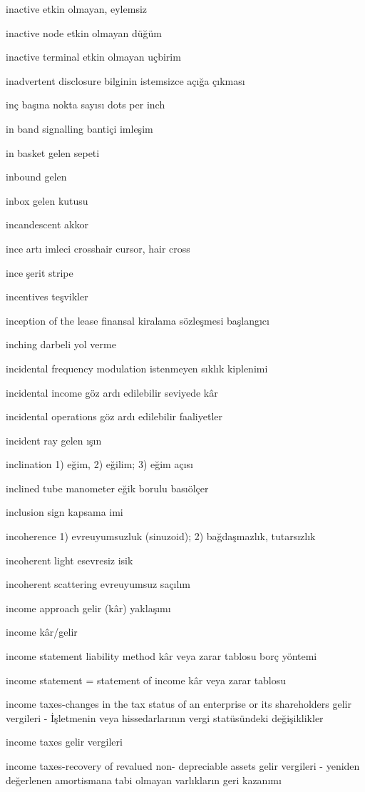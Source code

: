 \documentclass[12pt,fleqn]{article}\usepackage{../../common}
\begin{document}
inactive etkin olmayan, eylemsiz

inactive node etkin olmayan düğüm

inactive terminal etkin olmayan uçbirim

inadvertent disclosure bilginin istemsizce açığa çıkması

inç başına nokta sayısı dots per inch

in band signalling bantiçi imleşim

in basket gelen sepeti

inbound gelen

inbox gelen kutusu

incandescent akkor

ince artı imleci crosshair cursor, hair cross

ince şerit stripe

incentives teşvikler

inception of the lease finansal kiralama sözleşmesi başlangıcı

inching darbeli yol verme

incidental frequency modulation istenmeyen sıklık kiplenimi

incidental income göz ardı edilebilir seviyede kâr

incidental operations göz ardı edilebilir faaliyetler

incident ray gelen ışın

inclination 1) eğim, 2) eğilim; 3) eğim açısı

inclined tube manometer eğik borulu basıölçer

inclusion sign kapsama imi

incoherence 1) evreuyumsuzluk (sinuzoid); 2) bağdaşmazlık, tutarsızlık

incoherent light esevresiz isik

incoherent scattering evreuyumsuz saçılım

income approach gelir (kâr) yaklaşımı

income kâr/gelir

income statement liability method kâr veya zarar tablosu borç yöntemi

income statement = statement of income kâr veya zarar tablosu

income taxes-changes in the tax status of an enterprise or its shareholders gelir vergileri - İşletmenin veya hissedarlarının vergi statüsündeki değişiklikler

income taxes gelir vergileri

income taxes-recovery of revalued non- depreciable assets gelir vergileri - yeniden değerlenen amortismana tabi olmayan varlıkların geri kazanımı
\end{document}
